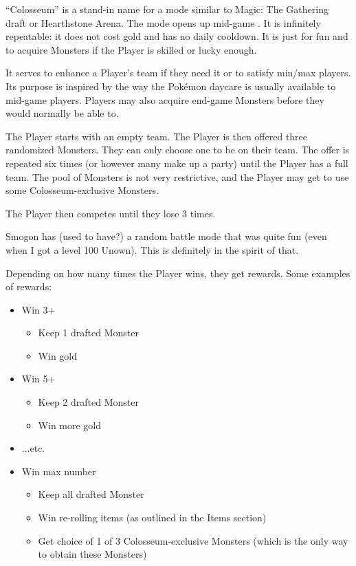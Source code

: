 ``Colosseum'' is a stand-in name for a mode similar to Magic: The Gathering draft or Hearthstone Arena. The mode opens up mid-game . It is infinitely repeatable: it does not cost gold and has no daily cooldown. It is just for fun and to acquire Monsters if the Player is skilled or lucky enough.

It serves to enhance a Player's team if they need it or to satisfy min/max players. Its purpose is inspired by the way the Pok\'{e}mon daycare is usually available to mid-game players. Players may also acquire end-game Monsters before they would normally be able to.

The Player starts with an empty team. The Player is then offered three randomized Monsters. They can only choose one to be on their team. The offer is repeated six times (or however many make up a party) until the Player has a full team. The pool of Monsters is not very restrictive, and the Player may get to use some Colosseum-exclusive Monsters.

The Player then competes until they lose 3  times.

Smogon has (used to have?) a random battle mode that was quite fun (even when I got a level 100 Unown). This is definitely in the spirit of that.

Depending on how many times the Player wins, they get rewards. Some examples of rewards:
\begin{itemize}
	\item{Win 3+
		\begin{itemize}
			\item{Keep 1 drafted Monster}
			\item{Win gold}
		\end{itemize}
	}
	\item{Win 5+
		\begin{itemize}
			\item{Keep 2 drafted Monster}
			\item{Win more gold}
		\end{itemize}
	}
	\item{...etc.}
	\item{Win max number 
		\begin{itemize}
			\item{Keep all drafted Monster}
			\item{Win re-rolling items (as outlined in the Items section)}
			\item{Get choice of 1 of 3 Colosseum-exclusive Monsters (which is the only way to obtain these Monsters)}
		\end{itemize}
	}
\end{itemize}

\newpage

\printbibliography

